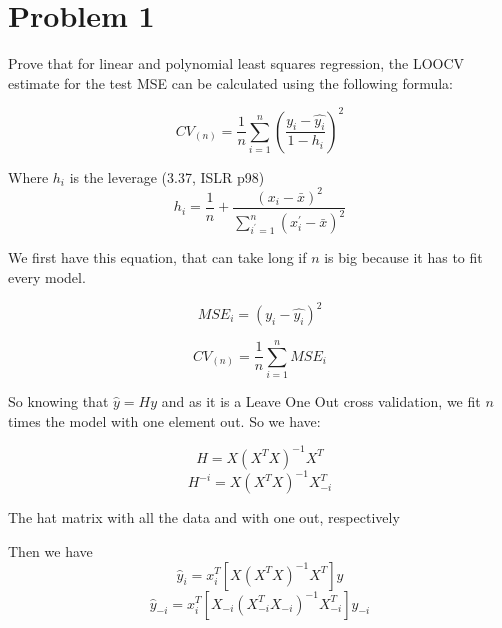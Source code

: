 \section*{Problem 1}


\noindent Prove that for linear and polynomial least squares regression, the LOOCV estimate for the test MSE can be calculated using the following formula: 


\begin{equation}
\label{LOOCV_shortcut}
CV_{(n)} = \frac{1}{n} \sum_{i = 1}^{n}\left( \frac{y_i - \hat{y_i}}{1 - h_i} \right)^2
\end{equation}

\noindent Where $ h_i $ is the leverage (3.37, ISLR p98)
\begin{equation}
\label{leverage}
h_i = \frac{1}{n} + \frac{(x_i - \bar{x})^2}{\sum_{i^{'} = 1}^{n} (x_i^{'} - \bar{x})^2}
\end{equation}


\noindent We first have this equation, that can take long if $n$ is big because it has to fit every model.

\[ MSE_i = (y_i - \hat{y_i})^2 \]

\[ CV_{(n)} = \frac{1}{n} \sum_{i = 1}^{n} MSE_i \]









\noindent So knowing that $ \hat{y} = Hy $ and as it is a Leave One Out cross validation, we fit $ n $ times the model with one element out. So we have:


\[ H = X(X^T X)^{-1} X^T \]
\[ H^{-i} = X(X^T X)^{-1} X^T_{-i} \]

\noindent The hat matrix with all the data and with one out, respectively

\noindent Then we have
\[ \hat{y}_i = x_i^T [X(X^T X)^{-1} X^T]y \] 
\[ \hat{y}_{-i} = x_i^T [X_{-i}(X_{-i}^T X_{-i})^{-1} X_{-i}^T]y_{-i} \]

